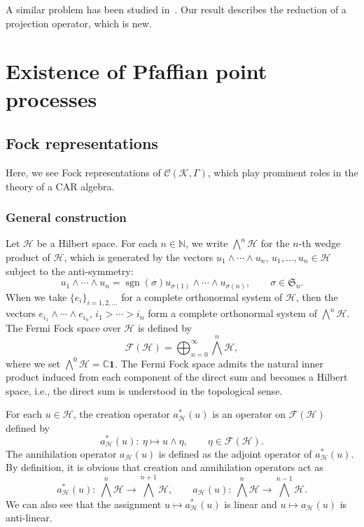 \documentclass[11pt]{article}
\numberwithin{equation}{section}
\numberwithin{equation}{section}
\newcommand{\mfrak}[1]{\mathfrak{#1}}
\newcommand{\mcal}[1]{\mathcal{#1}}
\newcommand{\mbb}[1]{\mathbb{#1}}
\begin{document}
 \begin{Remark}
A similar problem has been studied in~\cite{BufetovCundenQiu2019}. Our result describes the reduction of a projection operator, which is new.
 \end{Remark}

\setcounter{section}{1}
\section{Existence of Pfaffian point processes} \label{sect:existence_PfPP}
\subsection{Fock representations}
Here, we see Fock representations of $\mcal{C}(\mcal{K},\Gamma)$, which play prominent roles in the theory of a CAR algebra.
\subsubsection{General construction}
Let $\mcal{H}$ be a Hilbert space.
For each $n\in\mbb{N}$, we write $\bigwedge^{n}\mcal{H}$ for the $n$-th wedge product of $\mcal{H}$, which is generated by the vectors $u_{1}\wedge\cdots \wedge u_{n}$, $u_{1},\dots, u_{n}\in\mcal{H}$ subject to the anti-symmetry:
\begin{equation*}
	u_{1}\wedge\cdots \wedge u_{n}=\operatorname{sgn} (\sigma) u_{\sigma(1)}\wedge\cdots \wedge u_{\sigma (n)},\qquad \sigma\in \mfrak{S}_{n}.
\end{equation*}
When we take $\{e_{i}\}_{i=1,2,\dots}$ for a complete orthonormal system of $\mcal{H}$, then the vectors $e_{i_{1}}\wedge\cdots \wedge e_{i_{n}}$, $i_{1}>\cdots >i_{n}$ form a complete orthonormal system of $\bigwedge^{n}\mcal{H}$.
The Fermi Fock space over $\mcal{H}$ is defined by
\begin{equation*}
	\mcal{F}(\mcal{H})=\bigoplus_{n=0}^{\infty}\bigwedge^{n}\mcal{H},
\end{equation*}
where we set $\bigwedge^{0}\mcal{H}=\mbb{C}\bm{1}$.
The Fermi Fock space admits the natural inner product induced from each component of the direct sum and becomes a Hilbert space, i.e., the direct sum is understood in the topological sense.

For each $u\in \mcal{H}$, the creation operator $a_{\mcal{H}}^{\ast}(u)$ is an operator on $\mcal{F}(\mcal{H})$ defined by
\begin{equation*}
	a_{\mcal{H}}^{\ast}(u)\colon \ \eta\mapsto u\wedge \eta,\qquad \eta\in \mcal{F}(\mcal{H}).
\end{equation*}
The annihilation operator $a_{\mcal{H}}(u)$ is defined as the adjoint operator of $a_{\mcal{H}}^{\ast}(u)$.
By definition, it is obvious that creation and annihilation operators act as
\begin{equation*}
	a_{\mcal{H}}^{\ast}(u)\colon \ \bigwedge^{n}\mcal{H}\to \bigwedge^{n+1}\mcal{H},\qquad a_{\mcal{H}}(u)\colon \ \bigwedge^{n}\mcal{H}\to \bigwedge^{n-1}\mcal{H}.
\end{equation*}
We can also see that the assignment $u\mapsto a_{\mcal{H}}^{\ast}(u)$ is linear and $u\mapsto a_{\mcal{H}}(u)$ is anti-linear.
\end{document}
